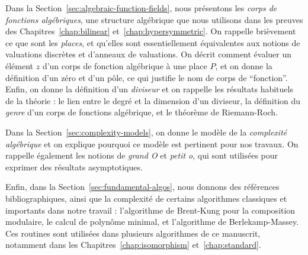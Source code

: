 Dans la Section~\ref{sec:algebraic-function-fields}, nous présentons les
\emph{corps de
fonctions algébriques}, une structure algébrique que nous utilisons dans les
preuves des Chapitres~\ref{chap:bilinear} et~\ref{chap:hypersymmetric}. On
rappelle brièvement ce que sont les \emph{places}, et qu'elles sont
essentiellement équivalentes aux notions de valuations discrètes et d'anneaux de
valuations. On décrit comment évaluer un élément $z$ d'un corps de fonction
algébrique à une place $P$, et on donne la définition d'un zéro et d'un pôle, ce
qui justifie le nom de corps de ``fonction''. Enfin, on donne la définition d'un
\emph{diviseur} et on rappelle les résultats habituels de la théorie : le lien
entre le degré et la dimension d'un diviseur, la définition du \emph{genre} d'un
corps de fonctions algébrique, et le théorème de Riemann-Roch.

Dans la Section~\ref{sec:complexity-models}, on donne le modèle de la
\emph{complexité algébrique} et on explique pourquoi ce modèle est pertinent
pour nos travaux. On rappelle également les notions de \emph{grand O} et
\emph{petit o}, qui sont utilisées pour exprimer des résultats asymptotiques.

Enfin, dans la Section~\ref{sec:fundamental-algos}, nous donnons des références
bibliographiques, ainsi que la complexité de certains algorithmes classiques et
importants dans notre travail : l'algorithme de Brent-Kung pour la composition
modulaire, le calcul de polynôme minimal, et l'algorithme de Berlekamp-Massey.
Ces routines sont utilisées dans plusieurs algorithmes de ce manuscrit, notamment
dans les Chapitres~\ref{chap:isomorphism} et~\ref{chap:standard}.

